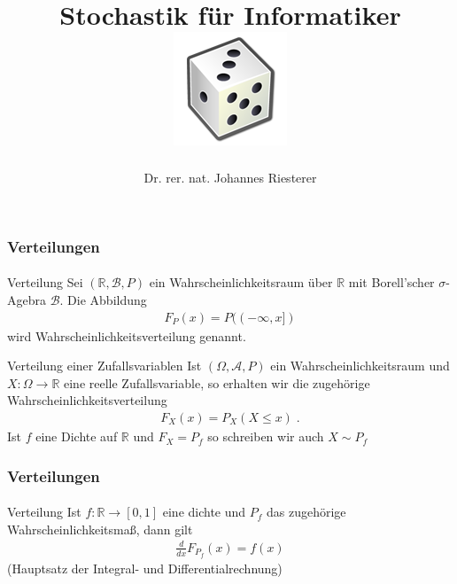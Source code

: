 \documentclass{beamer}
\begin{document}
\title[Stochastik] %
{Stochastik für Informatiker
\\
\includegraphics[scale=0.5]{img/craps}
}
\subtitle{}
\author[Dr. Johannes Riesterer] %
{Dr.  rer. nat. Johannes Riesterer}

\date[KPT 2004] %
{}

\subject{Stochastik}


\frame{\titlepage}

\begin{frame}
    \frametitle{Verteilungen}
\framesubtitle{}

\begin{block}{Verteilung}
Sei $(\mathbb{R}, \mathcal{B}, P)$ ein Wahrscheinlichkeitsraum über $\mathbb{R}$ mit Borell'scher $\sigma$-Agebra $\mathcal{B}$. Die Abbildung
\begin{align*}
F_P (x)  = P((-\infty, x ])
\end{align*}
wird Wahrscheinlichkeitsverteilung genannt.
\end{block}

\begin{block}{Verteilung einer Zufallsvariablen}
Ist $(\Omega, \mathcal{A}, P)$ ein Wahrscheinlichkeitsraum und $X : \Omega \to \mathbb{R}$ eine reelle Zufallsvariable, so erhalten wir die zugehörige Wahrscheinlichkeitsverteilung
\begin{align*}
F_X (x)  = P_X(  X \leq x)  \; .
\end{align*}
Ist $f$ eine Dichte auf $\mathbb{R}$ und $F_X = P_f$ so schreiben wir  auch $X \sim P_f$
\end{block}
 \end{frame}


\begin{frame}
    \frametitle{Verteilungen}
\framesubtitle{}

\begin{block}{Verteilung}
Ist $f: \mathbb{R} \to [0,1]$ eine dichte und $P_f$ das zugehörige Wahrscheinlichkeitsmaß, dann gilt 
\begin{align*}
\frac{d}{dx} F_{P_f} (x)  = f(x)
\end{align*}
(Hauptsatz der Integral- und Differentialrechnung)
\end{block}
 \end{frame}
\end{document}
